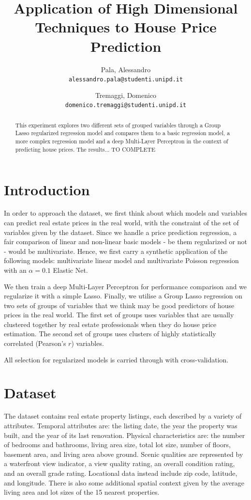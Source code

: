 \documentclass[a4paper, 9pt]{article}
\title{Application of High Dimensional Techniques to House Price Prediction}
\author{
  Pala, Alessandro\\
  \texttt{alessandro.pala@studenti.unipd.it}
  \and
  Tremaggi, Domenico\\
  \texttt{domenico.tremaggi@studenti.unipd.it}
}
\date{}
\begin{document}
\maketitle
\noindent
\begin{abstract}
This experiment explores two different sets of grouped variables through a Group Lasso regularized regression model and compares them to a basic regression model, a more complex regression model and a deep Multi-Layer Perceptron in the context of predicting house prices. The results... TO COMPLETE
\end{abstract}
\vspace{5pt}

\begin{multicols}{2}

\section{Introduction} \vspace{-7pt}
In order to approach the dataset, we first think about which models and variables can predict real estate prices in the real world, with the constraint of the set of variables given by the dataset. Since we handle a price prediction regression, a fair comparison of linear and non-linear basic models - be them regularized or not - would be multivariate. Hence, we first carry a synthetic application of the following models: multivariate linear model and multivariate Poisson regression with an $\alpha = 0.1$ Elastic Net.

We then train a deep Multi-Layer Perceptron for performance comparison and we regularize it with a simple Lasso.
Finally, we utilise a Group Lasso regression on two sets of groups of variables that we think may be good predictors of house prices in the real world. The first set of groups uses variables that are usually clustered together by real estate professionals when they do house price estimation. The second set of groups uses clusters of highly statistically correlated (Pearson's $r$) variables.

All selection for regularized models is carried through with cross-validation.

\section{Dataset} \vspace{-7pt}
The dataset contains real estate property listings, each described by a variety of attributes. Temporal attributes are: the listing date, the year the property was built, and the year of its last renovation. Physical characteristics are: the number of bedrooms and bathrooms, living area size, total lot size, number of floors, basement area, and living area above ground. Scenic qualities are represented by a waterfront view indicator, a view quality rating, an overall condition rating, and an overall grade rating. Locational data instead include zip code,  latitude, and longitude. There is also some additional spatial context given by the average living area and lot sizes of the 15 nearest properties.


\end{multicols}
\end{document}
